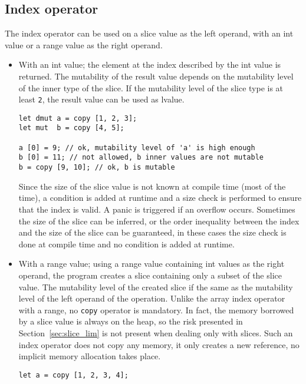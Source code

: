 \subsection{Index operator}

The index operator can be used on a slice value as the left operand, with an int
value or a range value as the right operand.

\begin{itemize}
\item With an int value; the element at the index described by the int value is
  returned. The mutability of the result value depends on the mutability level
  of the inner type of the slice. If the mutability level of the slice type is
  at least \texttt{2}, the result value can be used as lvalue.

  \begin{lstlisting}[style=coloredverbatim]
let dmut a = copy [1, 2, 3];
let mut  b = copy [4, 5];

a [0] = 9; // ok, mutability level of 'a' is high enough
b [0] = 11; // not allowed, b inner values are not mutable
b = copy [9, 10]; // ok, b is mutable
  \end{lstlisting}

  Since the size of the slice value is not known at compile time (most of the
  time), a condition is added at runtime and a size check is performed to ensure
  that the index is valid. A panic is triggered if an overflow occurs. Sometimes
  the size of the slice can be inferred, or the order inequality between the
  index and the size of the slice can be guaranteed, in these cases the size
  check is done at compile time and no condition is added at runtime.

\item With a range value; using a range value containing int values as the right
  operand, the program creates a slice containing only a subset of the slice
  value. The mutability level of the created slice if the same as the mutability
  level of the left operand of the operation. Unlike the array index operator
  with a range, no \texttt{copy} operator is mandatory. In fact, the memory
  borrowed by a slice value is always on the heap, so the risk presented in
  Section~\ref{sec:slice_lim} is not present when dealing only with slices. Such
  an index operator does not copy any memory, it only creates a new reference,
  no implicit memory allocation takes place.

  \begin{lstlisting}[style=coloredverbatim]
let a = copy [1, 2, 3, 4];


\end{lstlisting}
\end{itemize}
